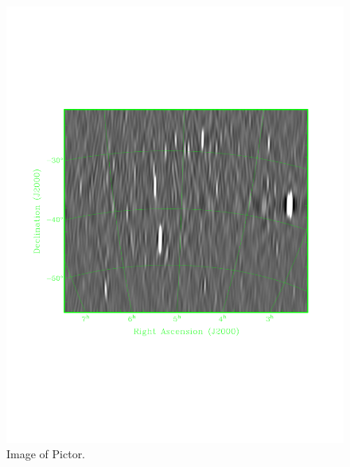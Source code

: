 \documentclass[twocolumn,numberedappendix]{emulateapj} \shorttitle{PSA64}
\begin{document}
\begin{figure}[!t]
\centering
\includegraphics[width=\columnwidth]{plots/gianni_pic_image.pdf}
\caption{Image of Pictor.}
\label{fig:field_image}
\end{figure}
\end{document}
